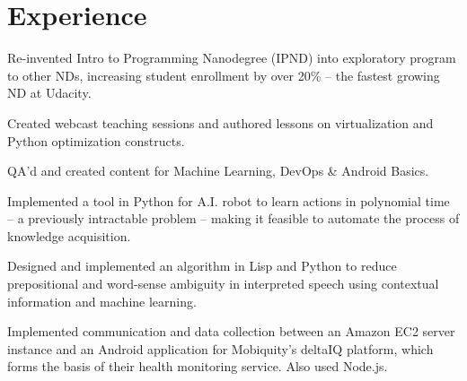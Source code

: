 \documentclass[]{deedy-resume-openfont}
\begin{document}
\hfill
\begin{minipage}[t]{0.66\textwidth} 


\section{Experience}

\vspace{\topsep} %
\begin{tightemize}

\item Re-invented Intro to Programming Nanodegree (IPND) into exploratory program to other NDs, increasing student enrollment by over 20\% -- the fastest growing ND at Udacity.

\item Created webcast teaching sessions and authored lessons on virtualization and Python optimization constructs.

\item QA'd and created content for Machine Learning, DevOps \& Android Basics.

\end{tightemize}
\sectionsep

\begin{tightemize}
\item Implemented a tool in Python for A.I. robot to learn actions in polynomial time -- a previously intractable problem -- making it feasible to automate the process of knowledge acquisition.

\item Designed and implemented an algorithm in Lisp and Python to reduce prepositional and word-sense ambiguity in interpreted speech using contextual information and machine learning.
\end{tightemize}
\sectionsep

\begin{tightemize}
\item Implemented communication and data collection between an Amazon EC2 server instance and an Android application for Mobiquity’s deltaIQ platform, which forms the basis of their health monitoring service. Also used Node.js.


\end{tightemize}
\end{minipage}
\end{document}
